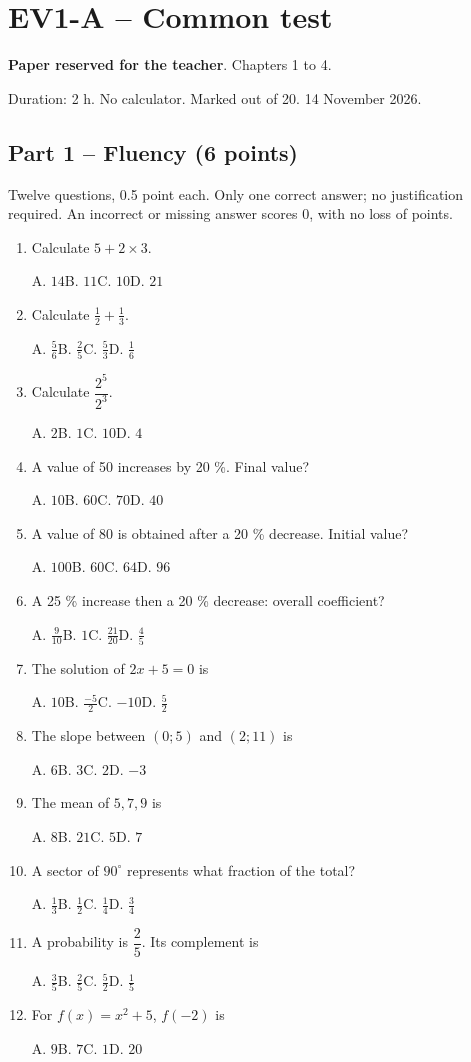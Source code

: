 \clearpage\section*{EV1-A -- Common test}\label{EV1-A}
\textbf{Paper reserved for the teacher}. Chapters 1 to 4.\par Duration: 2 h. No calculator. Marked out of 20. 14 November 2026.
\subsection*{Part 1 -- Fluency (6 points)}
Twelve questions, 0.5 point each. Only one correct answer; no justification required. An incorrect or missing answer scores 0, with no loss of points.
\begin{enumerate}
\item Calculate $5+2\times3$.\par A. $14$\quad B. $11$\quad C. $10$\quad D. $21$
\item Calculate $\frac12+\frac13$.\par A. $\frac{5}{6}$\quad B. $\frac{2}{5}$\quad C. $\frac{5}{3}$\quad D. $\frac{1}{6}$
\item Calculate $\dfrac{2^5}{2^{3}}$.\par A. $2$\quad B. $1$\quad C. $10$\quad D. $4$
\item A value of 50 increases by 20 \%. Final value?\par A. $10$\quad B. $60$\quad C. $70$\quad D. $40$
\item A value of 80 is obtained after a 20 \% decrease. Initial value?\par A. $100$\quad B. $60$\quad C. $64$\quad D. $96$
\item A 25 \% increase then a 20 \% decrease: overall coefficient?\par A. $\frac{9}{10}$\quad B. $1$\quad C. $\frac{21}{20}$\quad D. $\frac{4}{5}$
\item The solution of $2x+5=0$ is\par A. $10$\quad B. $\frac{-5}{2}$\quad C. $-10$\quad D. $\frac{5}{2}$
\item The slope between $(0;5)$ and $(2;11)$ is\par A. $6$\quad B. $3$\quad C. $2$\quad D. $-3$
\item The mean of $5, 7, 9$ is\par A. $8$\quad B. $21$\quad C. $5$\quad D. $7$
\item A sector of $90^\circ$ represents what fraction of the total?\par A. $\frac{1}{3}$\quad B. $\frac{1}{2}$\quad C. $\frac{1}{4}$\quad D. $\frac{3}{4}$
\item A probability is $\dfrac{2}{5}$. Its complement is\par A. $\frac{3}{5}$\quad B. $\frac{2}{5}$\quad C. $\frac{5}{2}$\quad D. $\frac{1}{5}$
\item For $f(x)=x^2+5$, $f(-2)$ is\par A. $9$\quad B. $7$\quad C. $1$\quad D. $20$
\end{enumerate}

